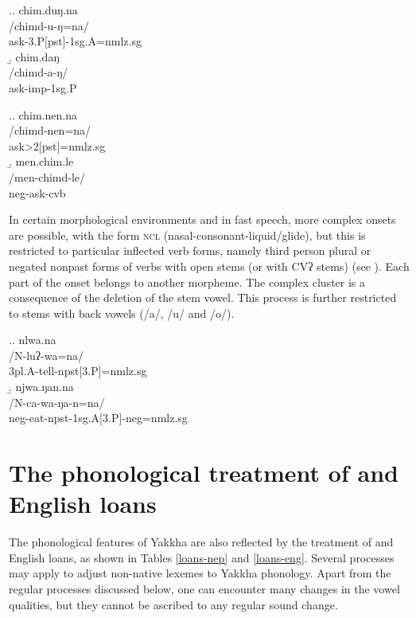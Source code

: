 
\ex.\a. \glll chim.duŋ.na\\
/chimd-u-ŋ=na/\\
ask{\sc -3.P[pst]-1sg.A=nmlz.sg}\\
\b. \glll chim.daŋ\\
/chimd-a-ŋ/\\
ask{\sc -imp-1sg.P}\\

\ex.\a. \glll chim.nen.na\\
/chimd-nen=na/\\
ask{>2[pst]=nmlz.sg}\\
\b. \glll men.chim.le\\
/men-chimd-le/\\
{\sc neg-}ask{\sc -cvb}\\


In certain morphological environments and in fast speech, more complex onsets are possible, with the form \textsc{ncl} (nasal-consonant-liquid/glide), but this is restricted to particular inflected verb forms, namely third person plural or negated nonpast forms of verbs with open stems (or with CVʔ stems) (see \Next). Each part of the onset belongs to another morpheme. The complex cluster is a consequence of the deletion of the stem vowel. This process is further restricted to stems with back vowels (/a/, /u/ and /o/). 



\ex.\a. \glll nlwa.na\\
/N-luʔ-wa=na/\\
{\sc 3pl.A-}tell{\sc -npst[3.P]=nmlz.sg}\\
\b. \glll njwa.ŋan.na\\
/N-ca-wa-ŋa-n=na/\\
{\sc neg-}eat{\sc -npst-1sg.A[3.P]-neg=nmlz.sg}\\



\section{The phonological treatment of  and English loans}\label{loansphon}

The phonological features of Yakkha are also reflected by the treatment of  and English loans, as shown in Tables \ref{loans-nep} and \ref{loans-eng}. Several processes may apply to adjust non-native lexemes to Yakkha phonology. Apart from the regular processes discussed below, one can encounter many changes in the vowel qualities, but they cannot be ascribed to any regular sound change.

